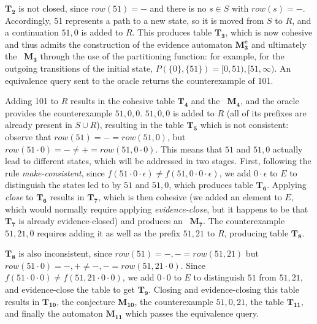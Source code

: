 $\mathbf{T_2}$ is not closed, since $\textit{row}(51) = -$
and there is no $s \in S$ with $\textit{row}(s) = -$.
Accordingly, 51 represents a path to a new state,
so it is moved from $S$ to $R$, and a continuation
$51,0$ is added to $R$.  This produces
table $\mathbf{T_3}$, which is now cohesive
and thus admits the construction
of the evidence automaton $\mathbf{M_3^e}$
and ultimately the \SFA\ $\mathbf{M_3}$
through the use of the partitioning function:
for example, for the outgoing transitions of the initial state,
$P(\{0\},\{51\}) = [0,51), [51,\infty)$.
An equivalence query sent to the oracle
returns the counterexample of 101.

Adding 101 to $R$ results in the
cohesive table $\mathbf{T_4}$ and the \SFA\ $\mathbf{M_4}$,
and the oracle provides the counterexample $51,0,0$.
$51,0,0$ is added to $R$ (all of its prefixes
are already present in $S \cup R$),
resulting in the table $\mathbf{T_5}$ which is not
consistent:
observe that $\textit{row}(51) = - = \textit{row}(51,0)$,
but $\textit{row}(51\cdot0) = - \neq + = \textit{row}(51,0\cdot0)$.
This means that $51$ and $51,0$ actually lead
to different states, which will be addressed in two stages.
First, following the rule \emph{make-consistent}, since
$f(51\cdot0\cdot\epsilon) \neq f(51,0\cdot0\cdot\epsilon)$,
we add $0\cdot\epsilon$ to $E$ to distinguish
the states led to by $51$ and $51,0$,
which produces table $\mathbf{T_6}$.
Applying \emph{close} to $\mathbf{T_6}$ results in $\mathbf{T_7}$,
which is then cohesive
(we added an element to $E$, which would
normally require applying \emph{evidence-close},
but it happens to be that $\mathbf{T_7}$ is already
evidence-closed) and produces
an \SFA\ $\mathbf{M_7}$.
The counterexample $51,21,0$
requires adding it as well as the prefix $51,21$
to $R$, producing table $\mathbf{T_8}$.

$\mathbf{T_8}$ is also inconsistent,
since $\textit{row}(51) = -,- = \textit{row}(51,21)$
but $\textit{row}(51\cdot0) = -,+ \neq -,- = \textit{row}(51,21\cdot0)$.
Since $f(51\cdot0\cdot0) \neq f(51,21\cdot0\cdot0)$,
we add $0\cdot0$ to $E$
to distinguish $51$ from $51,21$,
and evidence-close the table to get $\mathbf{T_9}$.
Closing and evidence-closing this table results in $\mathbf{T_{10}}$,
the conjecture $\mathbf{M_{10}}$, the counterexample
$51,0,21$, the table $\mathbf{T_{11}}$, and finally
the automaton $\mathbf{M_{11}}$ which passes
the equivalence query.

